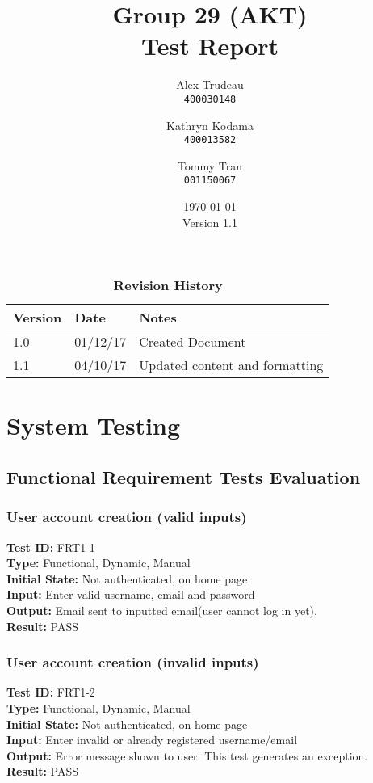 \documentclass[12pt,fleqn]{article}
\title{Group 29 (AKT)\\ Test Report}
\author{
Alex Trudeau\\
	\texttt{400030148}
\and
Kathryn Kodama\\
  	\texttt{400013582}
\and
Tommy Tran\\
	\texttt{001150067}
}
\date{\today\\Version 1.1}
\begin{document}
\maketitle



\pagebreak


\tableofcontents

\listoftables

\begin{table}[ht]
\caption{\bf Revision History}
\begin{tabularx}{\textwidth}{p{3cm}p{2cm}X}
\toprule {\bf Version} & {\bf Date} & {\bf Notes}\\
\midrule
1.0 & 01/12/17 & Created Document\\
1.1 & 04/10/17 & Updated  content and formatting\\
\bottomrule
\end{tabularx}
\end{table}



\clearpage

\section{System Testing}

\subsection{Functional Requirement Tests Evaluation}

\subsubsection{User account creation (valid inputs)}
\textbf{Test ID:} FRT1-1\\
\textbf{Type:} Functional, Dynamic, Manual\\
\textbf{Initial State:} Not authenticated, on home page\\
\textbf{Input:} Enter valid username, email and password\\
\textbf{Output:} Email sent to inputted email(user cannot log in yet). \\
\textbf{Result:} PASS

\subsubsection{User account creation (invalid inputs)}
\textbf{Test ID:} FRT1-2\\
\textbf{Type:} Functional, Dynamic, Manual\\
\textbf{Initial State:} Not authenticated, on home page\\
\textbf{Input:} Enter invalid or already registered username/email\\
\textbf{Output:} Error message shown to user.  This test generates an exception.\\
\textbf{Result:} PASS
\end{document}
